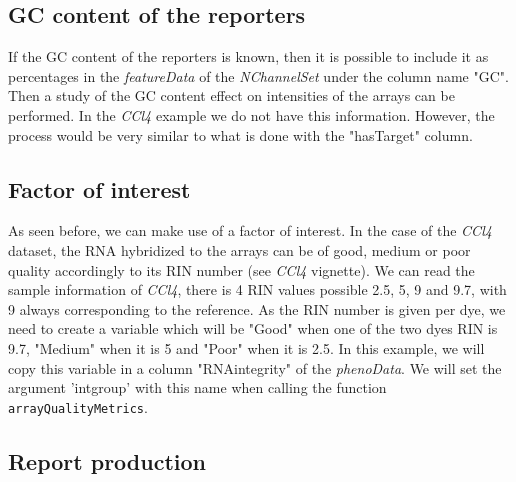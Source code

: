 \documentclass[a4paper]{article}
\newcommand{\Rclass}[1]{\textit{#1}}
\newcommand{\Rfunction}[1]{{\small\texttt{#1}}}
\begin{document}
\subsection{GC content of the reporters}

If the GC content of the reporters is known, then it is possible to include it as percentages in the
\Rclass{featureData} of the \Rclass{NChannelSet} under the column name "GC". Then a study of
the GC content effect on intensities of the arrays can be performed. In the \emph{CCl4} example we do not have this information. However, the process would be very similar to what is done with the "hasTarget" column.


\subsection{Factor of interest}

As seen before, we can make use of a factor of interest. In the case of the \emph{CCl4} dataset, the RNA hybridized to the arrays can be of good, medium or poor quality accordingly to its RIN number (see \emph{CCl4} vignette). We can read the sample information of \emph{CCl4}, there is 4 RIN values possible 2.5, 5, 9 and 9.7, with 9 always corresponding to the reference. As the RIN number is given per dye, we need to create a variable which will be "Good" when one of the two dyes RIN is 9.7, "Medium" when it is 5 and "Poor" when it is 2.5. In this example, we will copy this variable in a column "RNAintegrity" of the \Rclass{phenoData}. We will set the argument 'intgroup' with this name when calling the function \Rfunction{arrayQualityMetrics}.

%
\begin{Schunk}
\end{Schunk}
%

\subsection{Report production}
\end{document}
